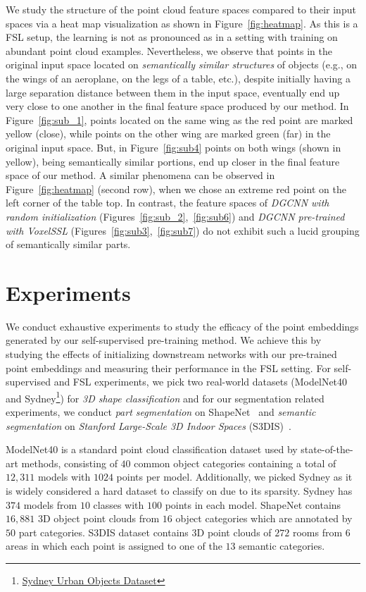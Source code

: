 \documentclass{article}
\begin{document}
We study the structure of the point cloud feature spaces compared to their input spaces via a 
heat map visualization as shown in Figure~\ref{fig:heatmap}.
As this is a FSL setup, the learning is not as pronounced as in a setting with training on abundant point cloud examples. Nevertheless, we observe that points in the original input space located on \emph{semantically similar structures} of objects (e.g., on the wings of an aeroplane, on the legs of a table, etc.), despite initially having a large separation distance between them in the input space, eventually end up very close to one another in the final feature space produced by our method. 
In Figure~\ref{fig:sub_1}, points located on the same wing as the red point are marked yellow (close), while points on the other wing are marked green (far) in the original input space. But, in Figure~\ref{fig:sub4} points on both wings (shown in yellow), being semantically similar portions, end up closer in the final feature space of our method. A similar phenomena can be observed in Figure~\ref{fig:heatmap} (second row), when we chose an extreme red point on the left corner of the table top. In contrast, the feature spaces of \emph{DGCNN with random initialization} (Figures~\ref{fig:sub_2},~\ref{fig:sub6}) and \emph{DGCNN pre-trained with VoxelSSL} (Figures~\ref{fig:sub3},~\ref{fig:sub7}) do not exhibit such a lucid grouping of semantically similar parts. 

\section{Experiments}
\label{others}
We conduct exhaustive experiments to study the efficacy of the point embeddings generated by our self-supervised pre-training method. We achieve this by studying the effects of initializing downstream networks with our pre-trained point embeddings and measuring their performance in the FSL setting.  
For self-supervised and FSL experiments, we pick two real-world datasets (ModelNet40~\cite{wu20153d} and Sydney\footnote{\href{http://www.acfr.usyd.edu.au/papers/SydneyUrbanObjectsDataset.shtml}{Sydney Urban Objects Dataset}}) for \emph{3D shape classification} and 
 for our segmentation related experiments, we conduct \emph{part segmentation} on ShapeNet~\cite{yi2016scalable} and \emph{semantic segmentation} on \emph{Stanford Large-Scale 3D Indoor Spaces} (S3DIS)~\cite{armeni20163d}.

 ModelNet40 is a standard point cloud classification dataset used by state-of-the-art methods, consisting of $40$ common object categories containing a total of $12,311$ models with $1024$ points per model. 
 Additionally, we picked Sydney as it is widely considered a hard dataset to classify on due to its sparsity. Sydney has $374$ models from $10$ classes with $100$ points in each model. 
 ShapeNet contains $16,881$ 3D object point clouds from $16$ object categories which are annotated by $50$ part categories. S3DIS dataset contains 3D point clouds of $272$ rooms from $6$ areas in which each point is assigned to one of the $13$ semantic categories. 
 
\end{document}

